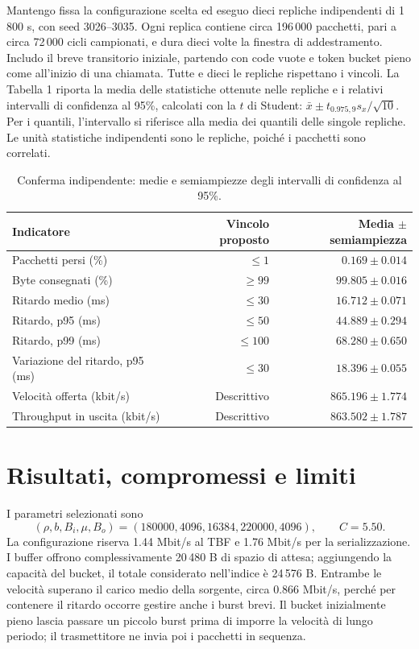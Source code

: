 \documentclass[10pt,a4paper]{article}
\begin{document}
Mantengo fissa la configurazione scelta ed eseguo dieci repliche indipendenti di
1\,800 s, con seed 3026--3035. Ogni replica contiene circa 196\,000 pacchetti,
pari a circa 72\,000 cicli campionati, e dura dieci volte la finestra di addestramento.
Includo il breve transitorio iniziale, partendo con code vuote e token bucket pieno
come all'inizio di una chiamata. Tutte e dieci le repliche rispettano i vincoli.
La Tabella 1 riporta la media delle statistiche ottenute nelle repliche e i relativi
intervalli di confidenza al 95\%, calcolati con la $t$ di Student:
$\bar x\pm t_{0.975,9}s_x/\sqrt{10}$. Per i quantili, l'intervallo si riferisce
alla media dei quantili delle singole repliche. Le unità statistiche indipendenti
sono le repliche, poiché i pacchetti sono correlati.

\begin{table}[h]
\centering\small
\caption{Conferma indipendente: medie e semiampiezze degli intervalli di confidenza al 95\%.}
\begin{tabular}{lrr}\toprule
Indicatore & Vincolo proposto & Media $\pm$ semiampiezza\\\midrule
Pacchetti persi (\%) & $\leq 1$ & $0.169 \pm 0.014$ \\
Byte consegnati (\%) & $\geq 99$ & $99.805 \pm 0.016$ \\
Ritardo medio (ms) & $\leq 30$ & $16.712 \pm 0.071$ \\
Ritardo, p95 (ms) & $\leq 50$ & $44.889 \pm 0.294$ \\
Ritardo, p99 (ms) & $\leq 100$ & $68.280 \pm 0.650$ \\
Variazione del ritardo, p95 (ms) & $\leq 30$ & $18.396 \pm 0.055$ \\
Velocità offerta (kbit/s) & Descrittivo & $865.196 \pm 1.774$ \\
Throughput in uscita (kbit/s) & Descrittivo & $863.502 \pm 1.787$ \\
\bottomrule\end{tabular}
\end{table}
\clearpage
\section{Risultati, compromessi e limiti}
I parametri selezionati sono
\[
(\rho,b,B_i,\mu,B_o)=(180000,4096,16384,220000,4096),\qquad C=5.50.
\]
La configurazione riserva 1.44 Mbit/s al TBF e 1.76 Mbit/s per la serializzazione.
I buffer offrono complessivamente 20\,480 B di spazio di attesa; aggiungendo la
capacità del bucket, il totale considerato nell'indice è 24\,576 B. Entrambe le
velocità superano il carico medio della sorgente, circa 0.866 Mbit/s, perché per
contenere il ritardo occorre gestire anche i burst brevi. Il bucket inizialmente
pieno lascia passare un piccolo burst prima di imporre la velocità di lungo periodo;
il trasmettitore ne invia poi i pacchetti in sequenza.
\end{document}
